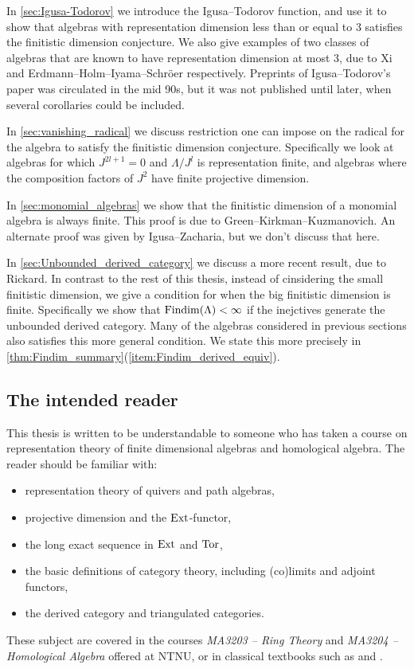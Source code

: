 In \cref{sec:Igusa-Todorov} we introduce the Igusa--Todorov function, and use it to show that algebras with representation dimension less than or equal to 3 satisfies the finitistic dimension conjecture. We also give examples of two classes of algebras that are known to have representation dimension at most 3, due to Xi and Erdmann--Holm--Iyama--Schröer respectively\cite{Xi02,EHIS04}. Preprints of Igusa--Todorov's paper\cite{IgTo05} was circulated in the mid 90s, but it was not published until later, when several corollaries could be included.

In \cref{sec:vanishing_radical} we discuss restriction one can impose on the radical for the algebra to satisfy the finitistic dimension conjecture. Specifically we look at algebras for which $J^{2l+1}=0$ and $\Lambda/J^l$ is representation finite, and algebras where the composition factors of $J^2$ have finite projective dimension.

In \cref{sec:monomial_algebras} we show that the finitistic dimension of a monomial algebra is always finite. This proof is due to Green--Kirkman--Kuzmanovich\cite{GKK91}. An alternate proof was given by Igusa--Zacharia\cite{IgZa90}, but we don't discuss that here.

In \cref{sec:Unbounded_derived_category} we discuss a more recent result, due to Rickard\cite{Rick19}. In contrast to the rest of this thesis, instead of cinsidering the small finitistic dimension, we give a condition for when the big finitistic dimension is finite. Specifically we show that $\operatorname{Findim}(\Lambda) < \infty$ if the inejctives generate the unbounded derived category. Many of the algebras considered in previous sections also satisfies this more general condition. We state this more precisely in \cref{thm:Findim_summary}(\ref{item:Findim_derived_equiv}).

\subsection*{The intended reader}
This thesis is written to be understandable to someone who has taken a course on representation theory of finite dimensional algebras and homological algebra. The reader should be familiar with: 
\renewcommand\labelitemi{---}
\begin{itemize}
  \item representation theory of quivers and path algebras,
  \item projective dimension and the $\operatorname{Ext}$-functor,
  \item the long exact sequence in $\operatorname{Ext}$ and $\operatorname{Tor}$,
  \item the basic definitions of category theory, including (co)limits and adjoint functors,
  \item the derived category and triangulated categories.
\end{itemize}
These subject are covered in the courses \textit{MA3203 -- Ring Theory} and \textit{MA3204 -- Homological Algebra} offered at NTNU, or in classical textbooks such as \cite{ARS97} and \cite{Wei94}.